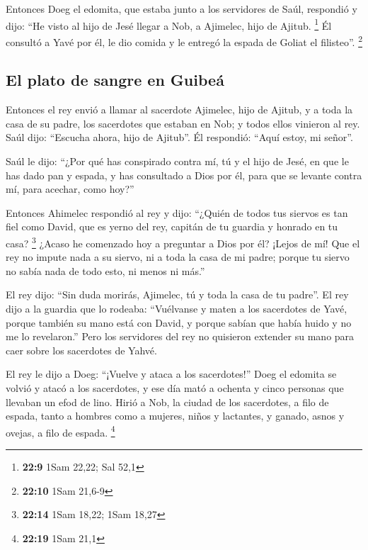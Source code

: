  Entonces Doeg el edomita, que estaba junto a los
servidores de Saúl, respondió y dijo: ``He visto al hijo de Jesé llegar
a Nob, a Ajimelec, hijo de Ajitub. \footnote{\textbf{22:9} 1Sam 22,22;
  Sal 52,1}  Él consultó a Yavé por él, le dio comida y
le entregó la espada de Goliat el filisteo''. \footnote{\textbf{22:10}
  1Sam 21,6-9}

\hypertarget{el-plato-de-sangre-en-guibeuxe1}{%
\subsection{El plato de sangre en
Guibeá}\label{el-plato-de-sangre-en-guibeuxe1}}

 Entonces el rey envió a llamar al sacerdote Ajimelec,
hijo de Ajitub, y a toda la casa de su padre, los sacerdotes que estaban
en Nob; y todos ellos vinieron al rey.  Saúl dijo:
``Escucha ahora, hijo de Ajitub''. Él respondió: ``Aquí estoy, mi
señor''.

 Saúl le dijo: ``¿Por qué has conspirado contra mí, tú y
el hijo de Jesé, en que le has dado pan y espada, y has consultado a
Dios por él, para que se levante contra mí, para acechar, como hoy?''

 Entonces Ahimelec respondió al rey y dijo: ``¿Quién de
todos tus siervos es tan fiel como David, que es yerno del rey, capitán
de tu guardia y honrado en tu casa? \footnote{\textbf{22:14} 1Sam 18,22;
  1Sam 18,27}  ¿Acaso he comenzado hoy a preguntar a Dios
por él? ¡Lejos de mí! Que el rey no impute nada a su siervo, ni a toda
la casa de mi padre; porque tu siervo no sabía nada de todo esto, ni
menos ni más.''

 El rey dijo: ``Sin duda morirás, Ajimelec, tú y toda la
casa de tu padre''.  El rey dijo a la guardia que lo
rodeaba: ``Vuélvanse y maten a los sacerdotes de Yavé, porque también su
mano está con David, y porque sabían que había huido y no me lo
revelaron.'' Pero los servidores del rey no quisieron extender su mano
para caer sobre los sacerdotes de Yahvé.

 El rey le dijo a Doeg: ``¡Vuelve y ataca a los
sacerdotes!'' Doeg el edomita se volvió y atacó a los sacerdotes, y ese
día mató a ochenta y cinco personas que llevaban un efod de lino.
 Hirió a Nob, la ciudad de los sacerdotes, a filo de
espada, tanto a hombres como a mujeres, niños y lactantes, y ganado,
asnos y ovejas, a filo de espada. \footnote{\textbf{22:19} 1Sam 21,1}

